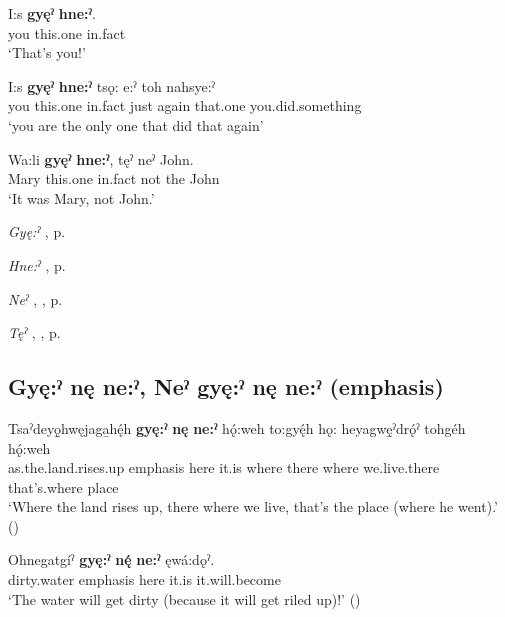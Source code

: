 \ea
\label{ex:gpar129}
\gll I:s \textbf{gyęˀ} \textbf{hne:ˀ}.\\
you this.one in.fact\\
\glt ‘That’s you!’
\z

\ea
\label{ex:gpar130}
\gll I:s \textbf{gyęˀ} \textbf{hne:ˀ} tsǫ: e:ˀ toh nahsye:ˀ\\
you this.one in.fact just again that.one you.did.something\\
\glt ‘you are the only one that did that again’
\z

\ea
\label{ex:gpar131}
\gll Wa:li \textbf{gyęˀ} \textbf{hne:ˀ}, tęˀ neˀ John.\\
Mary this.one in.fact not the John\\
\glt ‘It was Mary, not John.’
\z

\begin{CayugaRelated}
\item \textit{Gyę:ˀ} , p. \pageref{p:[gyę:ˀ]}\\
\item \textit{Hne:ˀ} , p. \pageref{p:[hne:ˀ] ‘in fact’}\\
\item \textit{Neˀ} , , p. \pageref{p:[neˀ]}\\
\item \textit{Tęˀ} , , p. \pageref{p:[tęˀ]}
\end{CayugaRelated}


\subsection*{\textbf{Gyę:ˀ nę ne:ˀ, Neˀ gyę:ˀ nę ne:ˀ} (emphasis)} \label{p:[gyę:ˀ nę ne:ˀ]}

\ea
\label{ex:gpar132}
\gll Tsaˀdeyǫ̱hwęjaga̱hę́h \textbf{gyę:ˀ} \textbf{nę} \textbf{ne:ˀ} hǫ́:weh to:gyę́h hǫ: heyagwę̱ˀdrǫ́ˀ tohgéh hǫ́:weh\\
as.the.land.rises.up emphasis here it.is where there where we.live.there that’s.where place\\
\glt ‘Where the land rises up, there where we live, that’s the place (where he went).’ (\cite{henry_de_2005})
\z

\ea
\label{ex:gpar133}
\gll Ohnegatgíˀ \textbf{gyę:ˀ} \textbf{nę́} \textbf{ne:ˀ} ęwá:dǫˀ.\\
dirty.water emphasis here it.is it.will.become\\
\glt ‘The water will get dirty (because it will get riled up)!’ (\cite{henry_de_2005})
\z

